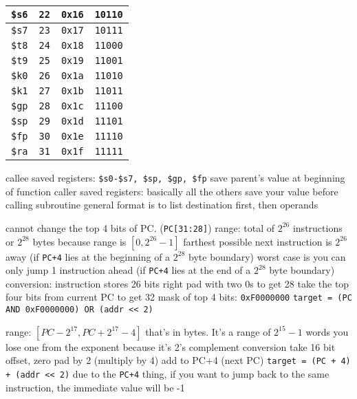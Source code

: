 \documentclass[12pt]{article}
\begin{document}
\begin{multicols*}{2}
\begin{flushleft}
\begin{outline}[longenum]
\begin{tabular}{|l r l l|}
  \verb|$s6| & \verb|22| & \verb|0x16| & \verb|10110| \\ \hline
  \verb|$s7| & \verb|23| & \verb|0x17| & \verb|10111| \\ \hline \hline
  \verb|$t8| & \verb|24| & \verb|0x18| & \verb|11000| \\ \hline
  \verb|$t9| & \verb|25| & \verb|0x19| & \verb|11001| \\ \hline \hline
  \verb|$k0| & \verb|26| & \verb|0x1a| & \verb|11010| \\ \hline
  \verb|$k1| & \verb|27| & \verb|0x1b| & \verb|11011| \\ \hline
  \verb|$gp| & \verb|28| & \verb|0x1c| & \verb|11100| \\ \hline
  \verb|$sp| & \verb|29| & \verb|0x1d| & \verb|11101| \\ \hline
  \verb|$fp| & \verb|30| & \verb|0x1e| & \verb|11110| \\ \hline
  \verb|$ra| & \verb|31| & \verb|0x1f| & \verb|11111| \\ \hline
  \end{tabular}
  \1 callee saved registers: \verb|$s0-$s7, $sp, $gp, $fp|
    \2 save parent's value at beginning of function
  \1 caller saved registers: basically all the others
    \2 save your value before calling subroutine
  \1 general format is to list destination first, then operands

  \1 cannot change the top 4 bits of PC. (\verb|PC[31:28]|)
  \1 range:
    \2 total of $2^{26}$ instructions or $2^{28}$ bytes
      \3 because range is $[0,2^{26}-1]$
    \2 farthest possible next instruction is $2^{26}$ away (if \verb|PC+4| lies at the beginning of a $2^{28}$ byte boundary)
    \2 worst case is you can only jump 1 instruction ahead (if \verb|PC+4| lies at the end of a $2^{28}$ byte boundary)
  \1 conversion:
    \2 instruction stores 26 bits
    \2 right pad with two 0s to get 28
    \2 take the top four bits from current PC to get 32
  \1 mask of top 4 bits: \verb|0xF0000000|
  \1 \verb|target = (PC AND 0xF0000000) OR (addr << 2)|

  \1 range: $[ PC - 2^{17}, PC + 2^{17} - 4 ]$
    \2 that's in bytes. It's a range of $2^{15}-1$ words
    \2 you lose one from the exponent because it's 2's complement
  \1 conversion
    \2 take 16 bit offset, zero pad by 2 (multiply by 4)
    \2 add to PC+4 (next PC)
  \1 \verb|target = (PC + 4) + (addr << 2)|
  \1 due to the \verb|PC+4| thing, if you want to jump back to the same instruction, the immediate value will be -1


\end{outline}
\end{flushleft}
\end{multicols*}
\end{document}
